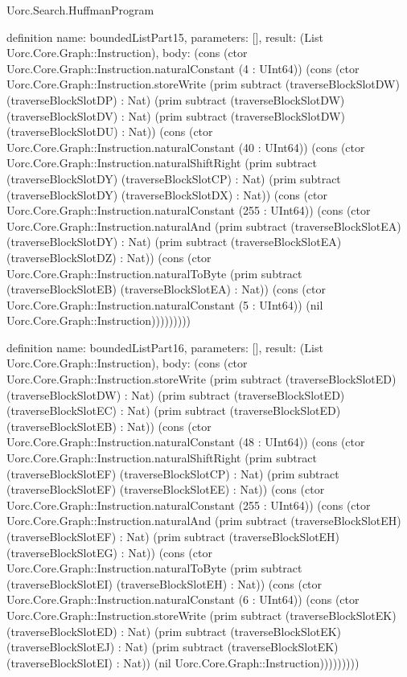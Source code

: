 \begin{lexlean}{Uorc.Search.HuffmanProgram}
\begin{semanticmodule}
definition{
  name: boundedListPart15,
  parameters: [],
  result: (List Uorc.Core.Graph::Instruction),
  body: (cons (ctor Uorc.Core.Graph::Instruction.naturalConstant (4 : UInt64)) (cons (ctor Uorc.Core.Graph::Instruction.storeWrite (prim subtract (traverseBlockSlotDW) (traverseBlockSlotDP) : Nat) (prim subtract (traverseBlockSlotDW) (traverseBlockSlotDV) : Nat) (prim subtract (traverseBlockSlotDW) (traverseBlockSlotDU) : Nat)) (cons (ctor Uorc.Core.Graph::Instruction.naturalConstant (40 : UInt64)) (cons (ctor Uorc.Core.Graph::Instruction.naturalShiftRight (prim subtract (traverseBlockSlotDY) (traverseBlockSlotCP) : Nat) (prim subtract (traverseBlockSlotDY) (traverseBlockSlotDX) : Nat)) (cons (ctor Uorc.Core.Graph::Instruction.naturalConstant (255 : UInt64)) (cons (ctor Uorc.Core.Graph::Instruction.naturalAnd (prim subtract (traverseBlockSlotEA) (traverseBlockSlotDY) : Nat) (prim subtract (traverseBlockSlotEA) (traverseBlockSlotDZ) : Nat)) (cons (ctor Uorc.Core.Graph::Instruction.naturalToByte (prim subtract (traverseBlockSlotEB) (traverseBlockSlotEA) : Nat)) (cons (ctor Uorc.Core.Graph::Instruction.naturalConstant (5 : UInt64)) (nil Uorc.Core.Graph::Instruction)))))))))
}

definition{
  name: boundedListPart16,
  parameters: [],
  result: (List Uorc.Core.Graph::Instruction),
  body: (cons (ctor Uorc.Core.Graph::Instruction.storeWrite (prim subtract (traverseBlockSlotED) (traverseBlockSlotDW) : Nat) (prim subtract (traverseBlockSlotED) (traverseBlockSlotEC) : Nat) (prim subtract (traverseBlockSlotED) (traverseBlockSlotEB) : Nat)) (cons (ctor Uorc.Core.Graph::Instruction.naturalConstant (48 : UInt64)) (cons (ctor Uorc.Core.Graph::Instruction.naturalShiftRight (prim subtract (traverseBlockSlotEF) (traverseBlockSlotCP) : Nat) (prim subtract (traverseBlockSlotEF) (traverseBlockSlotEE) : Nat)) (cons (ctor Uorc.Core.Graph::Instruction.naturalConstant (255 : UInt64)) (cons (ctor Uorc.Core.Graph::Instruction.naturalAnd (prim subtract (traverseBlockSlotEH) (traverseBlockSlotEF) : Nat) (prim subtract (traverseBlockSlotEH) (traverseBlockSlotEG) : Nat)) (cons (ctor Uorc.Core.Graph::Instruction.naturalToByte (prim subtract (traverseBlockSlotEI) (traverseBlockSlotEH) : Nat)) (cons (ctor Uorc.Core.Graph::Instruction.naturalConstant (6 : UInt64)) (cons (ctor Uorc.Core.Graph::Instruction.storeWrite (prim subtract (traverseBlockSlotEK) (traverseBlockSlotED) : Nat) (prim subtract (traverseBlockSlotEK) (traverseBlockSlotEJ) : Nat) (prim subtract (traverseBlockSlotEK) (traverseBlockSlotEI) : Nat)) (nil Uorc.Core.Graph::Instruction)))))))))
}


\end{semanticmodule}
\end{lexlean}
